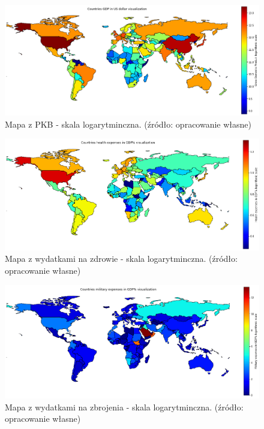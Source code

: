 \documentclass[11pt]{report}
\begin{document}
    \begin{figure}[ht!]
        \centering
        \includegraphics[width=1 \textwidth]{fig/CLUST/gdp2015.png}
        \caption{Mapa z PKB - skala logarytminczna. (źródło: opracowanie własne)}
        \label{fig:clustGDP2015_log}
    \end{figure}

    \begin{figure}[ht!]
        \centering
        \includegraphics[width=1 \textwidth]{fig/CLUST/health2015.png}
        \caption{Mapa z wydatkami na zdrowie - skala logarytminczna. (źródło: opracowanie własne)}
        \label{fig:clustHealth2015_log}
    \end{figure}

    \begin{figure}[ht!]
        \centering
        \includegraphics[width=1 \textwidth]{fig/CLUST/military2015.png}
        \caption{Mapa z wydatkami na zbrojenia - skala logarytminczna. (źródło: opracowanie własne)}
        \label{fig:clustMilitary2015_log}
    \end{figure}
\end{document}
